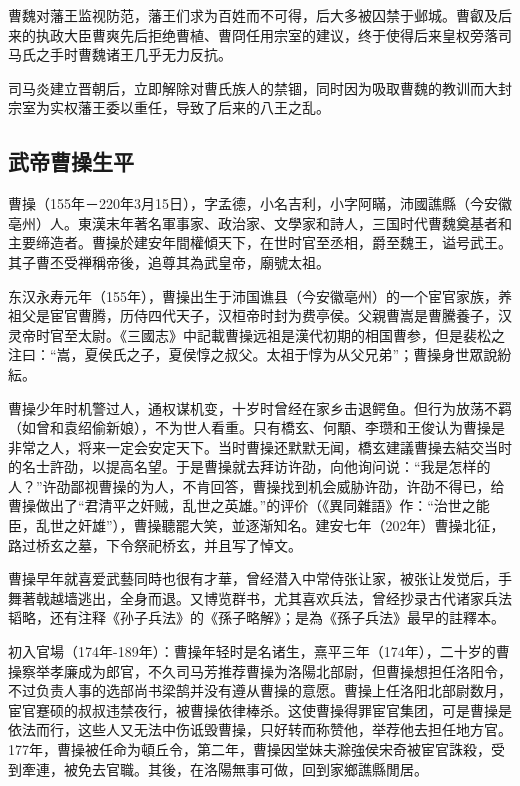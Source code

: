 曹魏对藩王监视防范，藩王们求为百姓而不可得，后大多被囚禁于邺城。曹叡及后来的执政大臣曹爽先后拒绝曹植、曹冏任用宗室的建议，终于使得后来皇权旁落司马氏之手时曹魏诸王几乎无力反抗。

司马炎建立晋朝后，立即解除对曹氏族人的禁锢，同时因为吸取曹魏的教训而大封宗室为实权藩王委以重任，导致了后来的八王之乱。

\subsection{武帝曹操生平}

曹操（155年－220年3月15日），字孟德，小名吉利，小字阿瞞，沛國譙縣（今安徽亳州）人。東漢末年著名軍事家、政治家、文學家和詩人，三国时代曹魏奠基者和主要缔造者。曹操於建安年間權傾天下，在世时官至丞相，爵至魏王，谥号武王。其子曹丕受禅稱帝後，追尊其為武皇帝，廟號太祖。

东汉永寿元年（155年），曹操出生于沛国谯县（今安徽亳州）的一个宦官家族，养祖父是宦官曹腾，历侍四代天子，汉桓帝时封为费亭侯。父親曹嵩是曹騰養子，汉灵帝时官至太尉。《三國志》中記載曹操远祖是漢代初期的相国曹参，但是裴松之注曰：“嵩，夏侯氏之子，夏侯惇之叔父。太祖于惇为从父兄弟”；曹操身世眾說紛紜。

曹操少年时机警过人，通权谋机变，十岁时曾经在家乡击退鳄鱼。但行为放荡不羁（如曾和袁绍偷新娘），不为世人看重。只有橋玄、何顒、李瓒和王俊认为曹操是非常之人，将来一定会安定天下。当时曹操还默默无闻，橋玄建議曹操去結交当时的名士許劭，以提高名望。于是曹操就去拜访许劭，向他询问说：“我是怎样的人？”许劭鄙视曹操的为人，不肯回答，曹操找到机会威胁许劭，许劭不得已，给曹操做出了“君清平之奸贼，乱世之英雄。”的评价（《異同雜語》作：“治世之能臣，乱世之奸雄”），曹操聽罷大笑，並逐渐知名。建安七年（202年）曹操北征，路过桥玄之墓，下令祭祀桥玄，并且写了悼文。

曹操早年就喜爱武藝同時也很有才華，曾经潜入中常侍张让家，被张让发觉后，手舞著戟越墙逃出，全身而退。又博览群书，尤其喜欢兵法，曾经抄录古代诸家兵法韬略，还有注释《孙子兵法》的《孫子略解》；是為《孫子兵法》最早的註釋本。

初入官場（174年-189年）：曹操年轻时是名诸生，熹平三年（174年），二十岁的曹操察举孝廉成为郎官，不久司马芳推荐曹操为洛陽北部尉，但曹操想担任洛阳令，不过负责人事的选部尚书梁鹄并没有遵从曹操的意愿。曹操上任洛阳北部尉数月，宦官蹇硕的叔叔违禁夜行，被曹操依律棒杀。这使曹操得罪宦官集团，可是曹操是依法而行，这些人又无法中伤诋毁曹操，只好转而称赞他，举荐他去担任地方官。177年，曹操被任命为頓丘令，第二年，曹操因堂妹夫滁強侯宋奇被宦官誅殺，受到牽連，被免去官職。其後，在洛陽無事可做，回到家鄉譙縣閒居。

